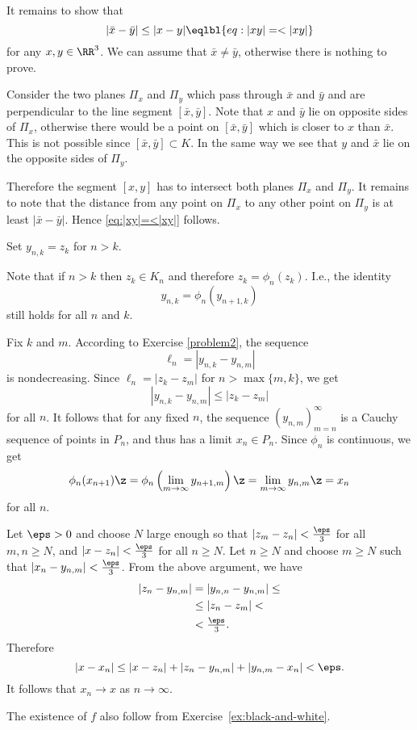 It remains to show that 
$$|\bar x-\bar y|\le|x-y|
\eqlbl{eq:|xy|=<|xy|}$$ 
for any $x,y\in\RR^3$. 
We can assume that $\bar x\ne \bar y$,
otherwise there is nothing to prove.

Consider the two planes $\Pi_x$ and $\Pi_y$ which pass through $\bar x$ and $\bar y$ and are perpendicular to the line segment $[\bar x,\bar y]$.
Note that $x$ and $\bar y$ lie on opposite sides of $\Pi_x$,
otherwise there would be a point on $[\bar x,\bar y]$ which is closer to $x$ than $\bar x$.
This is not possible since $[\bar x,\bar y]\subset K$.
In the same way we see that $y$ and $\bar x$ lie on the opposite sides of $\Pi_y$.

Therefore the segment $[x,y]$ has to intersect both planes $\Pi_x$ and $\Pi_y$.
It remains to note that the distance from any point on $\Pi_x$ to any other point on $\Pi_y$ is at least $|\bar x-\bar y|$.
Hence \ref{eq:|xy|=<|xy|} follows.

Set $y_{n,k}=z_k$ for $n> k$.

Note that if $n>k$ then $z_k\in K_n$
and therefore $z_k=\phi_n(z_k)$.
I.e., the identity 
$$y_{n,k}=\phi_{n}(y_{n+1,k})$$ 
still holds for all $n$ and $k$.

Fix $k$ and $m$.
According to Exercise \ref{problem2},
the sequence 
$$\ell_n=|y_{n,k}-y_{n,m}|$$
is nondecreasing.
Since $\ell_n=|z_k-z_m|$ for $n>\max\{m,k\}$,
we get
$$|y_{n,k}-y_{n,m}|\le |z_k-z_m|$$
for all $n$.
It follows that for any fixed $n$,
the sequence
$\left(y_{n,m}\right)_{m=n}^\infty$ is a Cauchy sequence of points in $P_n$, 
and thus has a limit $x_n \in P_n$.
Since $\phi_n$ is continuous, we get 
$$\phi_n(x_{n+1}) \z= \phi_n\left(\lim_{m\to\infty} y_{n+1,m} \right) \z= \lim_{m\to\infty} y_{n,m} \z= x_n$$
for all $n$.

Let $\eps > 0$ and choose $N$ large enough so that $|z_m - z_n| < \tfrac{\eps}{3}$ for all $m,n \ge N$, and $|x - z_n| < \tfrac{\eps}{3}$ for all $n \ge N$.  Let $n \ge N$ and choose $m \ge N$ such that $|x_n - y_{n,m}| < \tfrac{\eps}{3}$.  From the above argument, 
we have
\begin{align*}
|z_n - y_{n,m}| &= |y_{n,n} - y_{n,m}| \le
\\
&\le|z_n - z_m| <
\\
&<\tfrac{\eps}{3}.
\end{align*}
Therefore
$$
|x - x_n|\le |x - z_n| + |z_n - y_{n,m}| + |y_{n,m} - x_n|< \eps.
$$
It follows that $x_n \to x$ as $n\to\infty$.

The existence of $f$ also follow from Exercise~\ref{ex:black-and-white}.

